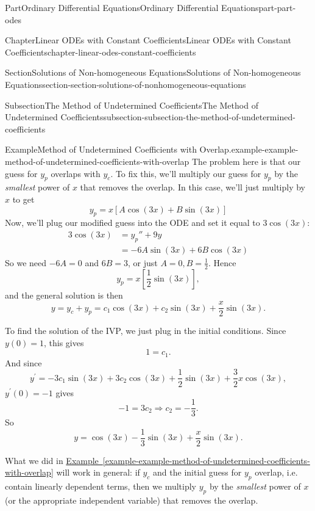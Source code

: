 \documentclass[twoside,10pt,]{book}
\newcommand{\xreffont}{\relax}
\numberwithin{equation}{part}
\begin{document}
\begin{partptx}{Part}{Ordinary Differential Equations}{}{Ordinary Differential Equations}{}{}{part-part-odes}
\begin{chapterptx}{Chapter}{Linear ODEs with Constant Coefficients}{}{Linear ODEs with Constant Coefficients}{}{}{chapter-linear-odes-constant-coefficients}
\begin{sectionptx}{Section}{Solutions of Non-homogeneous Equations}{}{Solutions of Non-homogeneous Equations}{}{}{section-section-solutions-of-nonhomogeneous-equations}
\begin{subsectionptx}{Subsection}{The Method of Undetermined Coefficients}{}{The Method of Undetermined Coefficients}{}{}{subsection-subsection-the-method-of-undetermined-coefficients}
\begin{example}{Example}{Method of Undetermined Coefficients with Overlap.}{example-example-method-of-undetermined-coefficients-with-overlap}
The problem here is that our guess for \(y_{p}\) overlaps with \(y_{c}\). To fix this, we'll multiply our guess for \(y_{p}\) by the \emph{smallest} power of \(x\) that removes the overlap. In this case, we'll just multiply by \(x\) to get%
\begin{equation*}
y_{p} = x[A\cos(3x)+B\sin(3x)]
\end{equation*}
Now, we'll plug our modified guess into the ODE and set it equal to \(3\cos(3x)\):%
\begin{align*}
3\cos(3x)& = y_{p}'' + 9y\\
& = -6A\sin(3x)+6B\cos(3x)
\end{align*}
So we need \(-6A = 0\) and \(6B = 3\), or just \(A = 0,B = \frac{1}{2}\). Hence%
\begin{equation*}
y_{p} = x\left[\frac{1}{2}\sin(3x)\right],
\end{equation*}
and the general solution is then%
\begin{equation*}
y = y_{c}+y_{p} = c_{1}\cos(3x)+c_{2}\sin(3x) + \frac{x}{2}\sin(3x).
\end{equation*}
%
\par
To find the solution of the IVP, we just plug in the initial conditions. Since \(y(0) = 1\), this gives%
\begin{equation*}
1 = c_{1}.
\end{equation*}
And since%
\begin{equation*}
y^\prime = -3c_{1}\sin(3x)+3c_{2}\cos(3x) + \frac{1}{2}\sin(3x)+\frac{3}{2}x\cos(3x),
\end{equation*}
\(y^\prime(0)=-1\) gives%
\begin{equation*}
-1 = 3c_{2}\Rightarrow c_{2} = -\frac{1}{3}.
\end{equation*}
So%
\begin{equation*}
y = \cos(3x)-\frac{1}{3}\sin(3x)+\frac{x}{2}\sin(3x).
\end{equation*}
%
\end{example}
What we did in \hyperref[example-example-method-of-undetermined-coefficients-with-overlap]{Example~{\xreffont\ref{example-example-method-of-undetermined-coefficients-with-overlap}}} will work in general: if \(y_{c}\) and the initial guess for \(y_{p}\) overlap, i.e. contain linearly dependent terms, then we multiply \(y_{p}\) by the \emph{smallest} power of \(x\) (or the appropriate independent variable) that removes the overlap.%

\end{subsectionptx}
\end{sectionptx}
\end{chapterptx}
\end{partptx}
\end{document}
